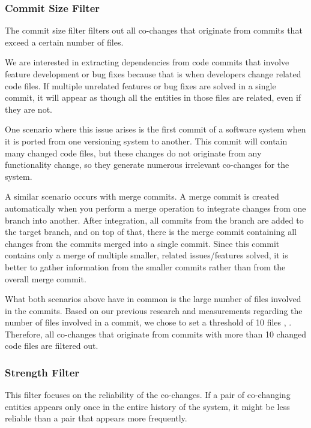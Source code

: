 \documentclass{ieeeaccess}
\begin{document}
\subsubsection{Commit Size Filter}

The commit size filter filters out all co-changes that originate from commits that exceed a certain number of files.

We are interested in extracting dependencies from code commits that involve feature development or bug fixes because that is when developers change related code files. If multiple unrelated features or bug fixes are solved in a single commit, it will appear as though all the entities in those files are related, even if they are not.

One scenario where this issue arises is the first commit of a software system when it is ported from one versioning system to another. This commit will contain many changed code files, but these changes do not originate from any functionality change, so they generate numerous irrelevant co-changes for the system.

A similar scenario occurs with merge commits. A merge commit is created automatically when you perform a merge operation to integrate changes from one branch into another. After integration, all commits from the branch are added to the target branch, and on top of that, there is the merge commit containing all changes from the commits merged into a single commit. Since this commit contains only a merge of multiple smaller, related issues/features solved, it is better to gather information from the smaller commits rather than from the overall merge commit.

What both scenarios above have in common is the large number of files involved in the commits. Based on our previous research and measurements regarding the number of files involved in a commit, we chose to set a threshold of 10 files \cite{b4}, \cite{b5}. Therefore, all co-changes that originate from commits with more than 10 changed code files are filtered out.

\subsubsection{Strength Filter}

This filter focuses on the reliability of the co-changes. If a pair of co-changing entities appears only once in the entire history of the system, it might be less reliable than a pair that appears more frequently.
\end{document}

